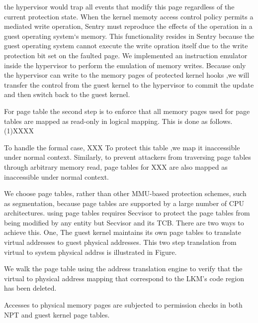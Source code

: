 \documentclass[conference]{IEEEtran}
\begin{document}
the hypervisor would trap all events that modify this page regardless of the current protection state. 
When the kernel memoty access control policy permits a mediated write operation, Sentry must reproduce the effects of the operation in a guest operating system`s memory. This functionality resides in Sentry because the guest operating system cannot execute the write opration itself due to the write protection bit set on the faulted page. We implemented an instruction emulator inside the hypervisor to perform the emulation of memory writes. 
Because only the hypervisor can write to the memory pages of protected kernel hooks ,we will transfer the control from the guest kernel to the hypervisor to commit the update and then switch back to the guest kernel. 


For page table
the second step is to enforce that all memory pages used for page tables are mapped as read-only in logical mapping. This is done as follows. (1)XXXX

To handle the formal case, XXX To protect this table ,we map it inaccessible under normal context. Similarly, to prevent attackers from traversing page tables through arbitrary memory read, page tables for XXX are also mapped as inaccessible under normal context. 

We choose page tables, rather than other MMU-based protection schemes, such as segmentation, because page tables are supported by a large number of CPU architectures. 
using page tables requires Secvisor to protect the page tables from being modified by any entity but Secvisor and its TCB.
There are two ways to achieve this. One, 
The guest kernel maintains its own page tables to translate virtual addresses to guest physical addresses.  This two step translation from virtual to system physical addrss is illustrated in Figure. 

We walk the page table using the address translation engine to verify that the virtual to physical address mapping that correspond to the LKM's code region has been deleted. 

Accesses to physical memory pages are subjected to permission checks in both NPT and guest kernel page tables. 
\end{document}
